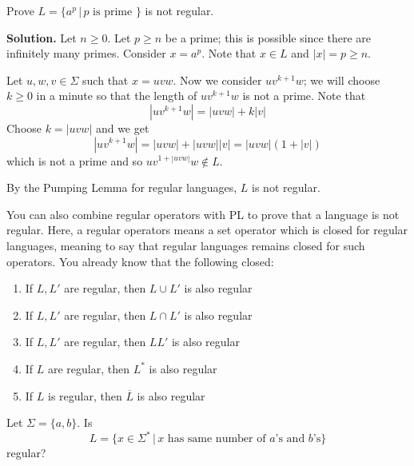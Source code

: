 





\newpage
\begin{eg}
Prove $L = \{a^p \,|\, p \text{ is prime } \}$ is not regular.

\textbf{Solution.} Let $n \geq 0$. Let $p \geq n$ be a prime; this is
possible since there are infinitely many primes. Consider $x = a^p$.
Note that $x \in L$ and $|x| = p \geq n$.

Let $u,w,v \in \Sigma$ such that $x = uvw$. Now we consider
$uv^{k+1}w$; we will choose $k\geq 0$ in a minute so that the
length of $uv^{k+1}w$ is not a prime. Note that
\[
 |uv^{k+1}w| = |uvw| + k|v|
\]
Choose $k = |uvw|$ and we get
\[
|uv^{k+1}w| = |uvw| + |uvw||v| = |uvw|(1 + |v|)
\]
which is not a prime and so $uv^{1+|uvw|}w \notin L$.

By the Pumping Lemma for regular languages, $L$ is not regular.
\\
\end{eg}





\newpage
You can also combine regular operators with PL to prove that a language
is not regular.
Here, a regular operators means a set operator which is closed
for regular languages, meaning to say that regular languages remains
closed for such operators.
You already know that the following closed:
\begin{enumerate}[topsep=0mm]
\item If $L,L'$ are regular, then $L \cup L'$ is also regular
\item If $L,L'$ are regular, then $L \cap L'$ is also regular
\item If $L,L'$ are regular, then $LL'$ is also regular
\item If $L$ are regular, then $L^*$ is also regular
\item If $L$ is regular, then $\overline{L}$ is also regular
\end{enumerate}


\begin{eg} Let $\Sigma = \{a,b\}$.
Is 
\[
L = \{ x \in \Sigma^* \,|\, x \text{ has same number of $a$'s
and $b$'s} \}
\]
regular?
\end{eg}

